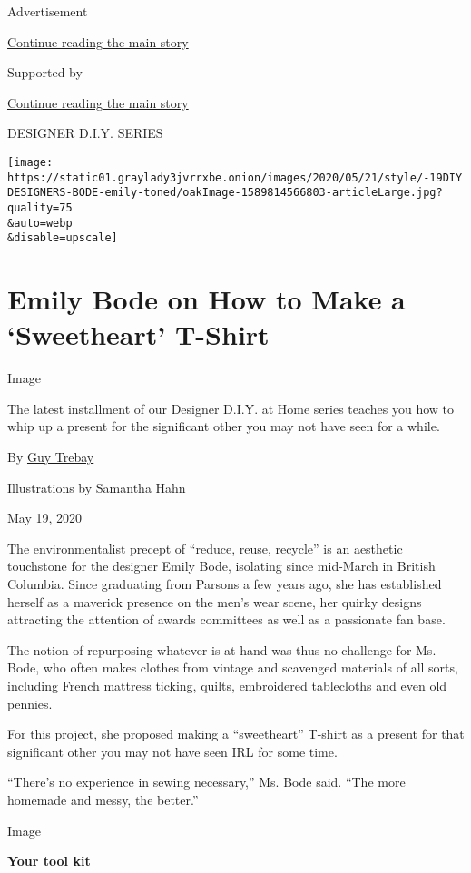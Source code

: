 Advertisement

\protect\hyperlink{after-top}{Continue reading the main story}

Supported by

\protect\hyperlink{after-sponsor}{Continue reading the main story}

DESIGNER D.I.Y. SERIES

\texttt{[image: https://static01.graylady3jvrrxbe.onion/images/2020/05/21/style/-19DIYDESIGNERS-BODE-emily-toned/oakImage-1589814566803-articleLarge.jpg?quality=75\\\&auto=webp\\\&disable=upscale]}

\hypertarget{emily-bode-on-how-to-make-a-sweetheart-t-shirt}{%
\section{Emily Bode on How to Make a `Sweetheart'
T-Shirt}\label{emily-bode-on-how-to-make-a-sweetheart-t-shirt}}

Image

The latest installment of our Designer D.I.Y. at Home series teaches you
how to whip up a present for the significant other you may not have seen
for a while.

By \href{https://www.nytimes3xbfgragh.onion/by/guy-trebay}{Guy Trebay}

Illustrations by Samantha Hahn

May 19, 2020

The environmentalist precept of ``reduce, reuse, recycle'' is an
aesthetic touchstone for the designer Emily Bode, isolating since
mid-March in British Columbia. Since graduating from Parsons a few years
ago, she has established herself as a maverick presence on the men's
wear scene, her quirky designs attracting the attention of awards
committees as well as a passionate fan base.

The notion of repurposing whatever is at hand was thus no challenge for
Ms. Bode, who often makes clothes from vintage and scavenged materials
of all sorts, including French mattress ticking, quilts, embroidered
tablecloths and even old pennies.

For this project, she proposed making a ``sweetheart'' T-shirt as a
present for that significant other you may not have seen IRL for some
time.

``There's no experience in sewing necessary,'' Ms. Bode said. ``The more
homemade and messy, the better.''

Image

\textbf{Your tool kit}

